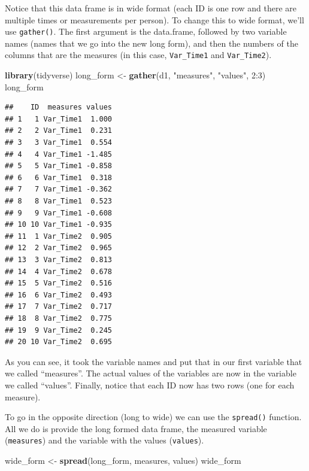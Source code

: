 \documentclass[]{tufte-book}
\newenvironment{Shaded}{}{}
\newcommand{\KeywordTok}[1]{\textcolor[rgb]{0.00,0.44,0.13}{\textbf{#1}}}
\newcommand{\DecValTok}[1]{\textcolor[rgb]{0.25,0.63,0.44}{#1}}
\newcommand{\StringTok}[1]{\textcolor[rgb]{0.25,0.44,0.63}{#1}}
\newcommand{\OperatorTok}[1]{\textcolor[rgb]{0.40,0.40,0.40}{#1}}
\newcommand{\NormalTok}[1]{#1}
\theoremstyle{definition}
\theoremstyle{definition}
\theoremstyle{remark}
\begin{document}
Notice that this data frame is in wide format (each ID is one row and
there are multiple times or measurements per person). To change this to
wide format, we'll use \texttt{gather()}. The first argument is the
data.frame, followed by two variable names (names that we go into the
new long form), and then the numbers of the columns that are the
measures (in this case, \texttt{Var\_Time1} and \texttt{Var\_Time2}).

\begin{Shaded}
\begin{Highlighting}[]
\KeywordTok{library}\NormalTok{(tidyverse)}
\NormalTok{long_form <-}\StringTok{ }\KeywordTok{gather}\NormalTok{(d1, }\StringTok{"measures"}\NormalTok{, }\StringTok{"values"}\NormalTok{, }
    \DecValTok{2}\OperatorTok{:}\DecValTok{3}\NormalTok{)}
\NormalTok{long_form}
\end{Highlighting}
\end{Shaded}

\begin{verbatim}
##    ID  measures values
## 1   1 Var_Time1  1.000
## 2   2 Var_Time1  0.231
## 3   3 Var_Time1  0.554
## 4   4 Var_Time1 -1.485
## 5   5 Var_Time1 -0.858
## 6   6 Var_Time1  0.318
## 7   7 Var_Time1 -0.362
## 8   8 Var_Time1  0.523
## 9   9 Var_Time1 -0.608
## 10 10 Var_Time1 -0.935
## 11  1 Var_Time2  0.905
## 12  2 Var_Time2  0.965
## 13  3 Var_Time2  0.813
## 14  4 Var_Time2  0.678
## 15  5 Var_Time2  0.516
## 16  6 Var_Time2  0.493
## 17  7 Var_Time2  0.717
## 18  8 Var_Time2  0.775
## 19  9 Var_Time2  0.245
## 20 10 Var_Time2  0.695
\end{verbatim}

As you can see, it took the variable names and put that in our first
variable that we called ``measures''. The actual values of the variables
are now in the variable we called ``values''. Finally, notice that each
ID now has two rows (one for each measure).

To go in the opposite direction (long to wide) we can use the
\texttt{spread()} function. All we do is provide the long formed data
frame, the measured variable (\texttt{measures}) and the variable with
the values (\texttt{values}).

\begin{Shaded}
\begin{Highlighting}[]
\NormalTok{wide_form <-}\StringTok{ }\KeywordTok{spread}\NormalTok{(long_form, measures, values)}
\NormalTok{wide_form}
\end{Highlighting}
\end{Shaded}
\end{document}

